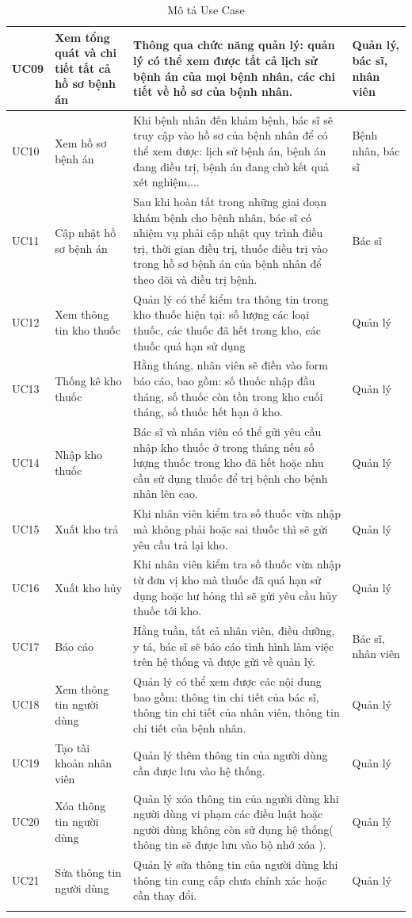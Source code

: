 \documentclass{report}
\begin{document}
\begin{longtable}{|m{1.4cm}|m{3cm}|m{6.5cm}|m{5.5cm}|}
		\hline
			UC09 & Xem tổng quát và chi tiết tất cả hồ sơ bệnh án
			& Thông qua chức năng quản lý: quản lý có thể xem được tất cả lịch sử bệnh án của mọi bệnh nhân, các chi tiết về hồ sơ của bệnh nhân. & Quản lý, bác sĩ, nhân viên \\ 
		\hline
			UC10 & Xem hồ sơ bệnh án
			& Khi bệnh nhân đến khám bệnh, bác sĩ sẽ truy cập vào hồ sơ của bệnh nhân để có thể xem được: lịch sử bệnh án, bệnh án đang điều trị, bệnh án đang chờ kết quả xét nghiệm,... & Bệnh nhân, bác sĩ\\ 
		\hline
			UC11 & Cập nhật hồ sơ bệnh án 
			& Sau khi hoàn tất trong những giai đoạn khám bệnh cho bệnh nhân, bác sĩ có nhiệm vụ phải cập nhật quy trình điều trị, thời gian điều trị, thuốc điều trị vào trong hồ sơ bệnh án của bệnh nhân để theo dõi và điều trị bệnh. & Bác sĩ \\ 
		\hline
			UC12 & Xem thông tin kho thuốc
			& Quản lý có thể kiểm tra thông tin trong kho thuốc hiện tại: số lượng các loại thuốc, các thuốc đã hết trong kho, các thuốc quá hạn sử dụng & Quản lý \\ 
		\hline
			UC13 & Thống kê kho thuốc
			& Hằng tháng, nhân viên sẽ điền vào form báo cáo, bao gồm: số thuốc nhập đầu tháng, số thuốc còn tồn trong kho cuối tháng, số thuốc hết hạn ở kho. & Quản lý \\ 
		\hline
			UC14 & Nhập kho thuốc 
			& Bác sĩ và nhân viên có thể gửi yêu cầu nhập kho thuốc ở trong tháng nếu số lượng thuốc trong kho đã hết hoặc nhu cầu sử dụng thuốc để trị bệnh cho bệnh nhân lên cao. & Quản lý \\ 
		\hline
			UC15 & Xuất kho trả 
			& Khi nhân viên kiểm tra số thuốc vừa nhập mà không phải hoặc sai thuốc thì sẽ gửi yêu cầu trả lại kho. & Quản lý \\ 
		\hline
			UC16 & Xuất kho hủy
			& Khi nhân viên kiểm tra số thuốc vừa nhập từ đơn vị kho mà thuốc đã quá hạn sử dụng hoặc hư hỏng thì sẽ gửi yêu cầu hủy thuốc tới kho. & Quản lý \\ 
		\hline
			UC17 & Báo cáo
			& Hằng tuần, tất cả nhân viên, điều dưỡng, y tá, bác sĩ sẽ báo cáo tình hình làm việc trên hệ thống và được gửi về quản lý. & Bác sĩ, nhân viên \\ 
		\hline
			UC18 & Xem thông tin người dùng
			& Quản lý có thể xem được các nội dung bao gồm: thông tin chi tiết của bác sĩ, thông tin chi tiết của nhân viên, thông tin chi tiết của bệnh nhân. & Quản lý \\ 
		\hline
			UC19 & Tạo tài khoản nhân viên
			& Quản lý thêm thông tin của người dùng cần được lưu vào hệ thống. & Quản lý \\ 
		\hline
			UC20 & Xóa thông tin người dùng
			& Quản lý xóa thông tin của người dùng khi người dùng vi phạm các điều luật hoặc người dùng không còn sử dụng hệ thống( thông tin sẽ được lưu vào bộ nhớ xóa ). & Quản lý \\ 
		\hline
			UC21 & Sửa thông tin người dùng 
			& Quản lý sửa thông tin của người dùng khi thông tin cung cấp chưa chính xác hoặc cần thay đổi. & Quản lý \\ 
		\hline
		\caption{Mô tả Use Case}
	\end{longtable}
	
\end{document}
